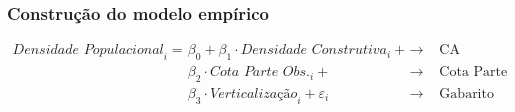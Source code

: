 \documentclass[%
    8pt, 
    aspectratio=169,
]{beamer}
\begin{document}
\begin{frame}
    \frametitle{Construção do modelo empírico}
    \begin{align}
        \textit{Densidade Populacional}_i =
        &\beta_0 + \beta_1 \cdot \textit{Densidade Construtiva}_i + & \rightarrow & \text{ CA}\nonumber\\
        &\beta_2 \cdot\textit{Cota Parte Obs.}_i + & \rightarrow & \text{ Cota Parte} \\
        &\beta_3\cdot\textit{Verticalização}_i + \varepsilon_i & \rightarrow & \text{ Gabarito}\nonumber
        \label{eq:reg}
    \end{align}

    \vspace{1cm}


\end{frame}
\end{document}

